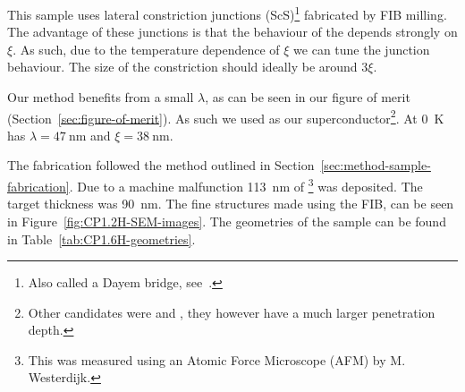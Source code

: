 This sample uses lateral constriction junctions (ScS)\footnote{Also called a Dayem bridge, see~\cite{likharevSuperconductingWeakLinks1979}.} fabricated by FIB milling. The advantage of these junctions is that the behaviour of the depends strongly on $\xi$. As such, due to the temperature dependence of $\xi$ we can tune the junction behaviour. The size of the constriction should ideally be around $3\xi$.\cite{likharevSuperconductingWeakLinks1979}

Our method benefits from a small $\lambda$, as can be seen in our figure of merit (Section~\ref{sec:figure-of-merit}). As such we used  as our superconductor\footnote{Other candidates were  and , they however have a much larger penetration depth.}. At \qty{0}{\kelvin}  has $\lambda = \qty{47}{\nano\meter}$ and $\xi = \qty{38}{\nano\meter}$.\cite{maxfieldSuperconductingPenetrationDepth1965}

The fabrication followed the method outlined in Section~\ref{sec:method-sample-fabrication}. Due to a machine malfunction \qty{113}{\nano\meter} of \footnote{This was measured using an Atomic Force Microscope (AFM) by M. Westerdijk.} was deposited. The target thickness was \qty{90}{\nano\meter}. The fine structures made using the FIB, can be seen in Figure~\ref{fig:CP1.2H-SEM-images}. The geometries of the sample can be found in Table~\ref{tab:CP1.6H-geometries}.

